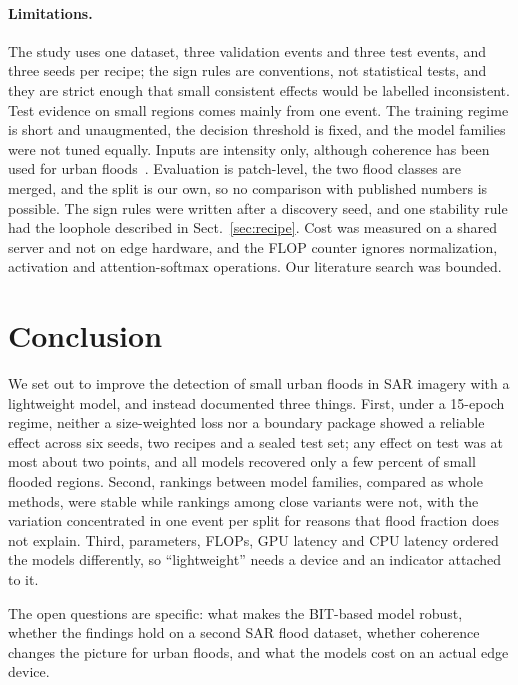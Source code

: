\documentclass[runningheads]{llncs}
\begin{document}
\paragraph{Limitations.} The study uses one dataset, three validation events and three test
events, and three seeds per recipe; the sign rules are conventions, not statistical tests, and they
are strict enough that small consistent effects would be labelled inconsistent. Test
evidence on small regions comes mainly from one event. The training regime is short and
unaugmented, the decision threshold is fixed, and the model families were not tuned equally.
Inputs are intensity only, although coherence has been used for urban
floods~\cite{li2019urbanflood}. Evaluation is patch-level, the two flood classes are merged, and the split is our own, so
no comparison with published numbers is possible. The sign
rules were written after a discovery seed, and one stability rule had the loophole described
in Sect.~\ref{sec:recipe}. Cost was measured on a shared server and not on edge hardware, and
the FLOP counter ignores normalization, activation and attention-softmax operations. Our
literature search was bounded.

\section{Conclusion}

We set out to improve the detection of small urban floods in SAR imagery with a lightweight
model, and instead documented three things. First, under a 15-epoch regime, neither a size-weighted loss nor a boundary package showed a
reliable effect across six seeds, two recipes and a sealed test set; any effect on test was
at most about two points, and all models recovered only a few percent of small flooded
regions. Second, rankings between model families, compared as whole methods, were stable while
rankings among close variants were not, with the
variation concentrated in one event per split for reasons that flood fraction does not
explain. Third, parameters, FLOPs, GPU latency and CPU latency ordered the models
differently, so ``lightweight'' needs a device and an indicator attached to it.

The open questions are specific: what makes the BIT-based model robust, whether the findings
hold on a second SAR flood dataset, whether coherence changes the picture for urban floods,
and what the models cost on an actual edge device.

\end{document}
